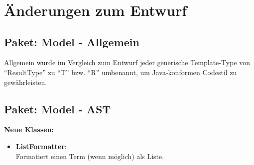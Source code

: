\documentclass[parskip=full,11pt,twoside]{scrartcl}
\begin{document}
\begin{minipage}{0.5\textwidth}
\begin{ganttchart}[x unit = 1.0cm, y unit chart = 0.7cm]{0}{4}
	\\
\\
\\
\\
\\
\\

\\
\\
\\
\\
\\
\\

\\
\\

\\
\end{ganttchart}
\end{minipage}

\section{Änderungen zum Entwurf}

\subsection{Paket: Model - Allgemein}

Allgemein wurde im Vergleich zum Entwurf jeder generische Template-Type von \enquote{ResultType} zu \enquote{T} bzw. \enquote{R} umbenannt, um Java-konformen Codestil zu gewährleisten.

\subsection{Paket: Model - AST}

\textbf{Neue Klassen:}\\
\begin{itemize}
	\item \textbf{ListFormatter}:\\
	Formatiert einen Term (wenn möglich) als Liste.
\end{itemize}
\end{document}
